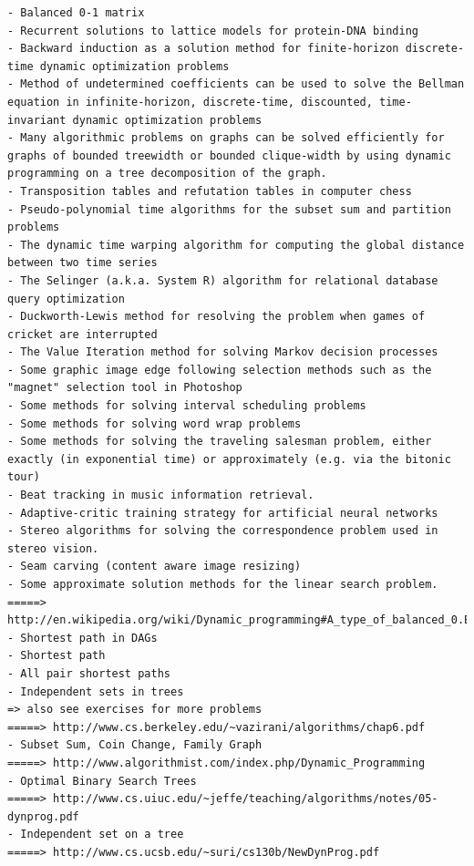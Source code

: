 {\begin{verbatim}
- Balanced 0-1 matrix
- Recurrent solutions to lattice models for protein-DNA binding
- Backward induction as a solution method for finite-horizon discrete-time dynamic optimization problems
- Method of undetermined coefficients can be used to solve the Bellman equation in infinite-horizon, discrete-time, discounted, time-invariant dynamic optimization problems
- Many algorithmic problems on graphs can be solved efficiently for graphs of bounded treewidth or bounded clique-width by using dynamic programming on a tree decomposition of the graph.
- Transposition tables and refutation tables in computer chess
- Pseudo-polynomial time algorithms for the subset sum and partition problems
- The dynamic time warping algorithm for computing the global distance between two time series
- The Selinger (a.k.a. System R) algorithm for relational database query optimization
- Duckworth-Lewis method for resolving the problem when games of cricket are interrupted
- The Value Iteration method for solving Markov decision processes
- Some graphic image edge following selection methods such as the "magnet" selection tool in Photoshop
- Some methods for solving interval scheduling problems
- Some methods for solving word wrap problems
- Some methods for solving the traveling salesman problem, either exactly (in exponential time) or approximately (e.g. via the bitonic tour)
- Beat tracking in music information retrieval.
- Adaptive-critic training strategy for artificial neural networks
- Stereo algorithms for solving the correspondence problem used in stereo vision.
- Seam carving (content aware image resizing)
- Some approximate solution methods for the linear search problem.
=====> http://en.wikipedia.org/wiki/Dynamic_programming#A_type_of_balanced_0.E2.80.931_matrix
- Shortest path in DAGs
- Shortest path
- All pair shortest paths
- Independent sets in trees
=> also see exercises for more problems
=====> http://www.cs.berkeley.edu/~vazirani/algorithms/chap6.pdf
- Subset Sum, Coin Change, Family Graph
=====> http://www.algorithmist.com/index.php/Dynamic_Programming
- Optimal Binary Search Trees
=====> http://www.cs.uiuc.edu/~jeffe/teaching/algorithms/notes/05-dynprog.pdf
- Independent set on a tree
=====> http://www.cs.ucsb.edu/~suri/cs130b/NewDynProg.pdf
\end{verbatim}
}
